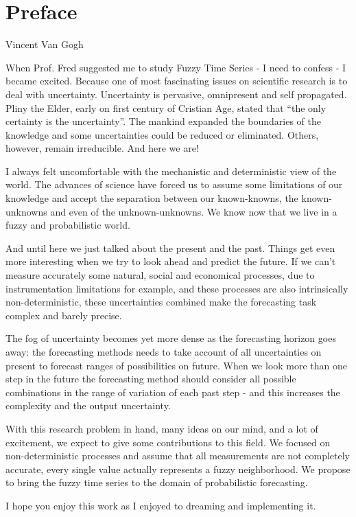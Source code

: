 \chapter*[Preface]{Preface} 

{Vincent Van Gogh}

When Prof. Fred suggested me to study Fuzzy Time Series - I need to confess - I became excited. Because one of most fascinating issues on scientific research is to deal with uncertainty. Uncertainty is pervasive, omnipresent and self propagated. Pliny the Elder, early on first century of Cristian Age, stated that ``the only certainty is the uncertainty''. The mankind expanded the boundaries of the knowledge and some uncertainties could be reduced or eliminated. Others, however, remain irreducible. And here we are!

I always felt uncomfortable with the mechanistic and deterministic view of the world. The advances of science have forced us to assume some limitations of our knowledge and accept the separation between our known-knowns, the known-unknowns and even of the unknown-unknowns. We know now that we live in a fuzzy and probabilistic world. 

And until here we just talked about the present and the past. Things get even more interesting when we try to look ahead and predict the future. If we can't measure accurately some natural, social and economical processes, due to instrumentation limitations for example, and these processes are also  intrinsically non-deterministic, these uncertainties combined make the forecasting task complex and barely precise.

The fog of uncertainty becomes yet more dense as the forecasting horizon goes away: the forecasting methods needs to take account of all uncertainties on present to forecast ranges of possibilities on future. When we look more than one step in the future the forecasting method should consider all possible combinations in the range of variation of each past step - and this increases the complexity and the output uncertainty.

With this research problem in hand, many ideas on our mind, and a lot of excitement, we expect to give some contributions to this field. We focused on non-deterministic processes and assume that all measurements are not completely accurate, every single value actually represents a fuzzy neighborhood. We propose to bring the fuzzy time series to the domain of probabilistic forecasting. 

I hope you enjoy this work as I enjoyed to dreaming and implementing it. 
